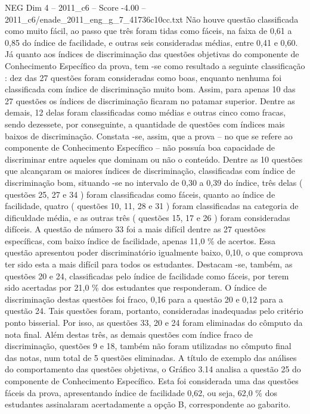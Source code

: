 \begin{textsample}{NEG Dim 4 – 2011\_c6 – Score -4.00 – 2011\_c6/enade\_2011\_eng\_g\_7\_41736c10cc.txt}
Não houve questão classificada como muito fácil, ao passo que três foram tidas como fáceis, na faixa de 0,61 a 0,85 do índice de facilidade, e outras seis consideradas médias, entre 0,41 e 0,60.
Já quanto aos índices de discriminação das questões objetivas do componente de Conhecimento Específico da prova, tem -se como resultado a seguinte classificação : dez das 27 questões foram consideradas como boas, enquanto nenhuma foi classificada com índice de discriminação muito bom.
Assim, para apenas 10 das 27 questões os índices de discriminação ficaram no patamar superior.
Dentre as demais, 12 delas foram classificadas como médias e outras cinco como fracas, sendo dezessete, por conseguinte, a quantidade de questões com índices mais baixos de discriminação.
Constata -se, assim, que a prova – no que se refere ao componente de Conhecimento Específico – não possuía boa capacidade de discriminar entre aqueles que dominam ou não o conteúdo.
Dentre as 10 questões que alcançaram os maiores índices de discriminação, classificadas com índice de discriminação bom, situando -se no intervalo de 0,30 a 0,39 do índice, três delas ( questões 25, 27 e 34 ) foram classificadas como fáceis, quanto ao índice de facilidade, quatro ( questões 10, 11, 28 e 31 ) foram classificadas na categoria de dificuldade média, e as outras três ( questões 15, 17 e 26 ) foram consideradas difíceis.
A questão de número 33 foi a mais difícil dentre as 27 questões específicas, com baixo índice de facilidade, apenas 11,0 \% de acertos.
Essa questão apresentou poder discriminatório igualmente baixo, 0,10, o que comprova ter sido esta a mais difícil para todos os estudantes.
Destacam -se, também, as questões 20 e 24, classificadas pelo índice de facilidade como fáceis, por terem sido acertadas por 21,0 \% dos estudantes que responderam.
O índice de discriminação destas questões foi fraco, 0,16 para a questão 20 e 0,12 para a questão 24.
Tais questões foram, portanto, consideradas inadequadas pelo critério ponto bisserial.
Por isso, as questões 33, 20 e 24 foram eliminadas do cômputo da nota final.
Além destas três, as demais questões com índice fraco de discriminação, questões 9 e 18, também não foram utilizadas no cômputo final das notas, num total de 5 questões eliminadas.
A título de exemplo das análises do comportamento das questões objetivas, o Gráfico 3.14 analisa a questão 25 do componente de Conhecimento Específico.
Esta foi considerada uma das questões fáceis da prova, apresentando índice de facilidade 0,62, ou seja, 62,0 \% dos estudantes assinalaram acertadamente a opção B, correspondente ao gabarito.

\end{textsample}
